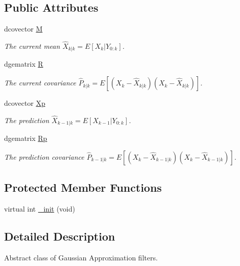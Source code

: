 \subsection*{Public Attributes}
\begin{CompactItemize}
\item 
dcovector \hyperlink{class_g_a___filter_8845e79b2c552edab83a18313bb48427}{M}
\begin{CompactList}\small\item\em The current mean $ \hat{X}_{k|k}=E[X_k |Y_{0:k}] $. \item\end{CompactList}\item 
dgematrix \hyperlink{class_g_a___filter_6a52a9cb2bbe7b568bdea626c951388f}{R}
\begin{CompactList}\small\item\em The current covariance $ \hat{P}_{k|k}=E[(X_k-\hat{X}_{k|k})(X_k-\hat{X}_{k|k})] $. \item\end{CompactList}\item 
dcovector \hyperlink{class_g_a___filter_9490630ecc3f4503003b8640eefe106a}{Xp}
\begin{CompactList}\small\item\em The prediction $ \hat{X}_{k-1|k}=E[X_{k-1} |Y_{0:k}] $. \item\end{CompactList}\item 
dgematrix \hyperlink{class_g_a___filter_7d6e23cf07e5b031d617f33ee25cab06}{Rp}
\begin{CompactList}\small\item\em The prediction covariance $ \hat{P}_{k-1|k}=E[(X_k-\hat{X}_{k-1|k})(X_k-\hat{X}_{k-1|k}) ] $. \item\end{CompactList}\end{CompactItemize}
\subsection*{Protected Member Functions}
\begin{CompactItemize}
\item 
virtual int \hyperlink{class_g_a___filter_7b5cb872bcedd752a4309f114625a4b8}{\_\-init} (void)
\end{CompactItemize}


\subsection{Detailed Description}
Abstract class of Gaussian Approximation filters. 

